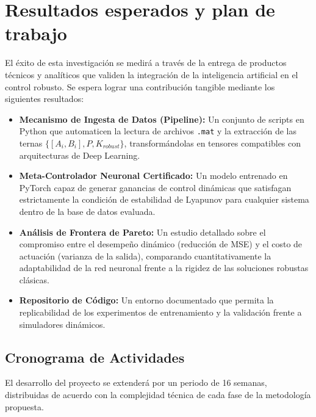 \documentclass[12pt,twoside]{report}
\begin{document}
\chapter{Resultados esperados y plan de trabajo}
\label{sec:experimentos}

El éxito de esta investigación se medirá a través de la entrega de productos técnicos y analíticos que validen la integración de la inteligencia artificial en el control robusto. Se espera lograr una contribución tangible mediante los siguientes resultados:

\begin{itemize}
    \item \textbf{Mecanismo de Ingesta de Datos (Pipeline):} Un conjunto de scripts en Python que automaticen la lectura de archivos \texttt{.mat} y la extracción de las ternas $\{[A_i, B_i], P, K_{robust}\}$, transformándolas en tensores compatibles con arquitecturas de Deep Learning.
    \item \textbf{Meta-Controlador Neuronal Certificado:} Un modelo entrenado en PyTorch capaz de generar ganancias de control dinámicas que satisfagan estrictamente la condición de estabilidad de Lyapunov para cualquier sistema dentro de la base de datos evaluada.
    \item \textbf{Análisis de Frontera de Pareto:} Un estudio detallado sobre el compromiso entre el desempeño dinámico (reducción de MSE) y el costo de actuación (varianza de la salida), comparando cuantitativamente la adaptabilidad de la red neuronal frente a la rigidez de las soluciones robustas clásicas.
    \item \textbf{Repositorio de Código:} Un entorno documentado que permita la replicabilidad de los experimentos de entrenamiento y la validación frente a simuladores dinámicos.
\end{itemize}

\section{Cronograma de Actividades}

El desarrollo del proyecto se extenderá por un periodo de 16 semanas, distribuidas de acuerdo con la complejidad técnica de cada fase de la metodología propuesta.
\end{document}
